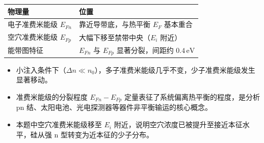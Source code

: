 \begin{formulabox}[答案汇总]
\begin{center}
\begin{tabular}{ll}
\toprule
\textbf{物理量} & \textbf{位置} \\
\midrule
电子准费米能级 $E_{Fn}$ & 靠近导带底，与热平衡 $E_F$ 基本重合 \\
空穴准费米能级 $E_{Fp}$ & 大幅下移至禁带中央（$E_i$ 附近） \\
能带图特征 & $E_{Fn}$ 与 $E_{Fp}$ 显著分裂，间距约 $0.4\,\text{eV}$ \\
\bottomrule
\end{tabular}
\end{center}
\end{formulabox}

\begin{insightbox}[物理图像]
\begin{itemize}
    \item 小注入条件下（$\Delta n\ll n_0$），多子准费米能级几乎不变，少子准费米能级发生显著移动。
    \item 准费米能级的分裂程度 $E_{Fn}-E_{Fp}$ 定量表征了系统偏离热平衡的程度，是分析 pn 结、太阳电池、光电探测器等器件非平衡输运的核心概念。
    \item 本题中空穴准费米能级移至 $E_i$ 附近，说明空穴浓度已被提升至接近本征水平，硅从强 n 型转变为近本征的少子分布。
\end{itemize}
\end{insightbox}
